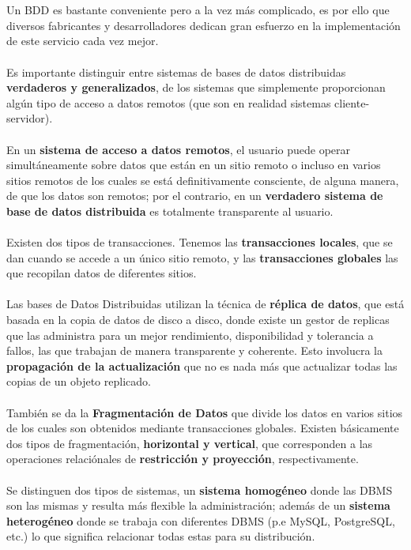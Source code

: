 \documentclass[10pt,a4paper,oneside]{article}
\begin{document}
\\\\Un BDD es bastante conveniente pero a la vez m\'as complicado, es por ello que diversos fabricantes y desarrolladores dedican gran esfuerzo en la implementaci\'on de este servicio cada vez mejor.
\\\\Es importante distinguir entre sistemas de bases de datos distribuidas {\bf verdaderos y generalizados}, de los sistemas que simplemente proporcionan alg\'un tipo de acceso a datos remotos (que son en realidad sistemas cliente-servidor).
\\\\En un {\bf sistema de acceso a datos remotos}, el usuario puede operar simult\'aneamente sobre datos que est\'an en un sitio remoto o incluso en varios sitios remotos de los cuales se est\'a definitivamente consciente, de alguna manera, de que los datos son remotos; por el contrario, en un {\bf verdadero sistema de base de datos distribuida} es totalmente transparente al usuario.
\\\\Existen dos tipos de transacciones. Tenemos las {\bf transacciones locales}, que se dan cuando se accede a un \'unico sitio remoto, y las {\bf transacciones globales} las que recopilan datos de diferentes sitios.
\\\\Las bases de Datos Distribuidas utilizan la t\'ecnica de {\bf r\'eplica de datos}, que est\'a basada en la copia de datos de disco a disco, donde existe un gestor de replicas que las administra para un mejor rendimiento, disponibilidad y tolerancia a fallos, las que trabajan de manera transparente y coherente. Esto involucra la {\bf propagaci\'on de la actualizaci\'on} que no es nada m\'as que actualizar todas las copias de un objeto replicado.
\\\\Tambi\'en se da la {\bf Fragmentaci\'on de Datos} que divide los datos en varios sitios de los cuales son obtenidos mediante transacciones globales. Existen b\'asicamente dos tipos de fragmentaci\'on, {\bf horizontal y vertical}, que corresponden a las operaciones relaci\'onales de {\bf restricci\'on y proyecci\'on}, respectivamente.
\\\\Se distinguen dos tipos de sistemas, un {\bf sistema homog\'eneo} donde las DBMS son las mismas  y resulta m\'as flexible la administraci\'on; adem\'as de un {\bf sistema heterog\'eneo} donde se trabaja con diferentes DBMS (p.e MySQL, PostgreSQL, etc.) lo que significa relacionar todas estas para su distribuci\'on.
\end{document}
